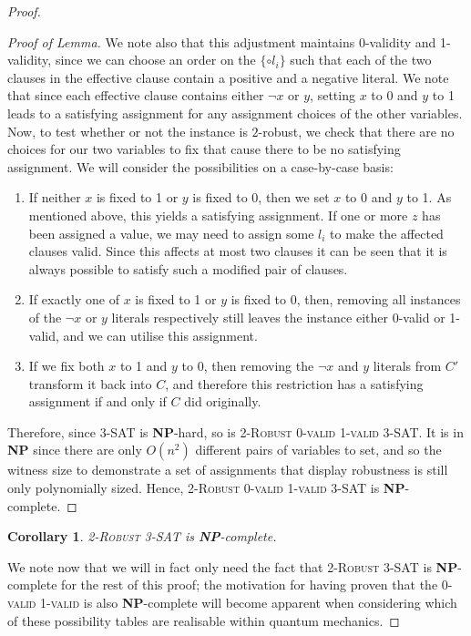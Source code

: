 \documentclass[reprint]{revtex4-1}
\newtheorem{cor}{Corollary}
\theoremstyle{definition}
\begin{document}
\begin{proof}
\begin{proof}[Proof of Lemma]
 We note also that this adjustment maintains 0-validity and 1-validity, since we can choose an order on the $\{\circ l_i\}$ such that each of the two clauses in the effective clause contain a positive and a negative literal. We note that since each effective clause contains either $\neg x$ or $y$, setting $x$ to 0 and $y$ to 1 leads to a satisfying assignment for any assignment choices of the other variables. Now, to test whether or not the instance is $2$-robust, we check that there are no choices for our two variables to fix that cause there to be no satisfying assignment. We will consider the possibilities on a case-by-case basis:
\begin{enumerate}
\item If neither $x$ is fixed to 1 or $y$ is fixed to 0, then we set $x$ to 0 and $y$ to 1. As mentioned above, this yields a satisfying assignment. If one or more $z$ has been assigned a value, we may need to assign some $l_i$ to make the affected clauses valid. Since this affects at most two clauses it can be seen that it is always possible to satisfy such a modified pair of clauses.

\item If exactly one of $x$ is fixed to 1 or $y$ is fixed to 0, then, removing all instances of the $\neg x$ or $y$ literals respectively still leaves the instance either 0-valid or 1-valid, and we can utilise this assignment.

\item If we fix both $x$ to 1 and $y$ to 0, then removing the $\neg x$ and $y$ literals from $C'$ transform it back into $C$, and therefore this restriction has a satisfying assignment if and only if $C$ did originally.
\end{enumerate}
Therefore, since \textsc{3-SAT} is \textbf{NP}-hard, so is \textsc{2-Robust 0-valid 1-valid 3-SAT}. It is in \textbf{NP} since there are only $O(n^2)$ different pairs of variables to set, and so the witness size to demonstrate a set of assignments that display robustness is still only polynomially sized.  Hence,  \textsc{2-Robust 0-valid 1-valid 3-SAT} is \textbf{NP}-complete.

\end{proof}
\begin{cor}
\textsc{2-Robust 3-SAT} is \textbf{NP}-complete.
\end{cor}
We note now that we will in fact only need the fact that \textsc{2-Robust 3-SAT} is \textbf{NP}-complete for the rest of this proof; the motivation for having proven that the \textsc{0-valid 1-valid} is also \textbf{NP}-complete will become apparent when considering which of these possibility tables are realisable within quantum mechanics.


\end{proof}
\end{document}
